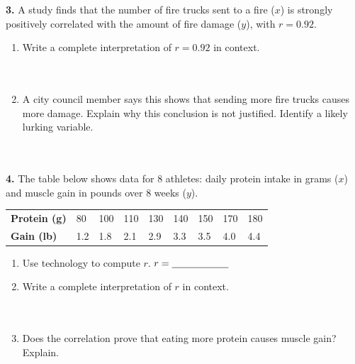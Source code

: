 \documentclass[10pt]{article}
\begin{document}
\vspace{0.2in}

\noindent\textbf{3.} A study finds that the number of fire trucks sent to a fire ($x$) is
strongly positively correlated with the amount of fire damage ($y$), with $r = 0.92$.

\begin{enumerate}[label=\textbf{(\alph*)}, leftmargin=2em, itemsep=0.16in]
  \item Write a complete interpretation of $r = 0.92$ in context.\\[8pt]
        \writeline\\[3pt]\writeline\\[3pt]\writeline
  \item A city council member says this shows that sending more fire trucks causes more
        damage. Explain why this conclusion is not justified. Identify a likely lurking
        variable.\\[8pt]
        \writeline\\[3pt]\writeline\\[3pt]\writeline
\end{enumerate}

\vspace{0.2in}

\noindent\textbf{4.} The table below shows data for 8 athletes: daily protein intake in grams
($x$) and muscle gain in pounds over 8 weeks ($y$).

\vspace{8pt}
\renewcommand{\arraystretch}{1.4}
\begin{tabularx}{\linewidth}{@{} l *{8}{C{1cm}} @{}}
\textbf{Protein (g)} & 80 & 100 & 110 & 130 & 140 & 150 & 170 & 180 \\
\textbf{Gain (lb)}   & 1.2 & 1.8 & 2.1 & 2.9 & 3.3 & 3.5 & 4.0 & 4.4 \\
\end{tabularx}

\begin{enumerate}[label=\textbf{(\alph*)}, leftmargin=2em, itemsep=0.16in]
  \item Use technology to compute $r$. \quad $r = \blank{2cm}$
  \item Write a complete interpretation of $r$ in context.\\[8pt]
        \writeline\\[3pt]\writeline\\[3pt]\writeline
  \item Does the correlation prove that eating more protein causes muscle gain?
        Explain.\\[8pt]
        \writeline\\[3pt]\writeline
\end{enumerate}
\end{document}
